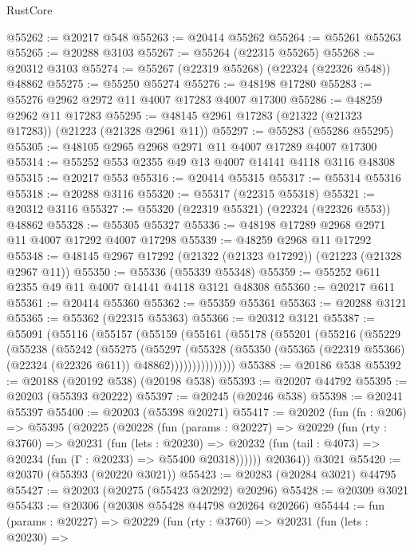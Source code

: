 \begin{lexlean}{RustCore}
\begin{coremodule}
@55262 := @20217 @548
@55263 := @20414 @55262
@55264 := @55261 @55263
@55265 := @20288 @3103
@55267 := @55264 (@22315 @55265)
@55268 := @20312 @3103
@55274 := @55267 (@22319 @55268) (@22324 (@22326 @548)) @48862
@55275 := @55250 @55274
@55276 := @48198 @17280
@55283 := @55276 @2962 @2972 @11 @4007 @17283 @4007 @17300
@55286 := @48259 @2962 @11 @17283
@55295 := @48145 @2961 @17283 (@21322 (@21323 @17283)) (@21223 (@21328 @2961 @11))
@55297 := @55283 (@55286 @55295)
@55305 := @48105 @2965 @2968 @2971 @11 @4007 @17289 @4007 @17300
@55314 := @55252 @553 @2355 @49 @13 @4007 @14141 @4118 @3116 @48308
@55315 := @20217 @553
@55316 := @20414 @55315
@55317 := @55314 @55316
@55318 := @20288 @3116
@55320 := @55317 (@22315 @55318)
@55321 := @20312 @3116
@55327 := @55320 (@22319 @55321) (@22324 (@22326 @553)) @48862
@55328 := @55305 @55327
@55336 := @48198 @17289 @2968 @2971 @11 @4007 @17292 @4007 @17298
@55339 := @48259 @2968 @11 @17292
@55348 := @48145 @2967 @17292 (@21322 (@21323 @17292)) (@21223 (@21328 @2967 @11))
@55350 := @55336 (@55339 @55348)
@55359 := @55252 @611 @2355 @49 @11 @4007 @14141 @4118 @3121 @48308
@55360 := @20217 @611
@55361 := @20414 @55360
@55362 := @55359 @55361
@55363 := @20288 @3121
@55365 := @55362 (@22315 @55363)
@55366 := @20312 @3121
@55387 := @55091
    (@55116
      (@55157
        (@55159
          (@55161
            (@55178
              (@55201
                (@55216
                  (@55229
                    (@55238
                      (@55242
                        (@55275
                          (@55297
                            (@55328
                              (@55350
                                (@55365 (@22319 @55366) (@22324 (@22326 @611)) @48862)))))))))))))))
@55388 := @20186 @538
@55392 := @20188 (@20192 @538) (@20198 @538)
@55393 := @20207 @44792
@55395 := @20203 (@55393 @20222)
@55397 := @20245 (@20246 @538)
@55398 := @20241 @55397
@55400 := @20203 (@55398 @20271)
@55417 := @20202
    (fun (fn : @206) =>
    @55395
      (@20225
        (@20228
          (fun (params : @20227) =>
          @20229
            (fun (rty : @3760) =>
            @20231
              (fun (lets : @20230) =>
              @20232 (fun (tail : @4073) => @20234 (fun (Γ : @20233) => @55400 @20318))))))
        @20364))
    @3021
@55420 := @20370 (@55393 (@20220 @3021))
@55423 := @20283 (@20284 @3021) @44795
@55427 := @20203 (@20275 (@55423 @20292) @20296)
@55428 := @20309 @3021
@55433 := @20306 (@20308 @55428 @44798 @20264 @20266)
@55444 := fun (params : @20227) =>
  @20229
    (fun (rty : @3760) =>
    @20231
      (fun (lets : @20230) =>

\end{coremodule}
\end{lexlean}
